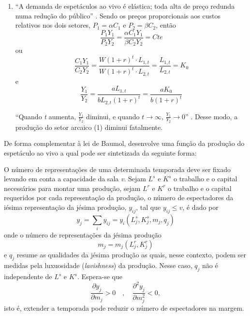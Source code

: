 \documentclass[a4paper, 12pt, openright, oneside, german, french, english, brazil]{abntex2}
\begin{document}
\begin{enumerate}
		\item ``A demanda de espetáculos ao vivo é elástica; toda alta de preço redunda numa redução do público'' \cite[p. 56]{benhamou2007economia}. Sendo os preços proporcionais aos custos relativos nos dois setores, $P_1 = \alpha C_1$ e $P_2 = \beta C_2$, então
		$$\frac{P_1Y_1}{P_2Y_2} = \frac{\alpha C_1Y_1}{\beta C_2Y_2} = Cte$$ ou
		$$\frac{C_1Y_1}{C_2Y_2} = \frac{W(1+r)^t \cdot L_{1,t}}{W(1+r)^t \cdot L_{2,t}} = \frac{L_{1,t}}{L_{2,t}} = K_0$$ e
		$$\frac{Y_1}{Y_2} = \frac{aL_{1,t}}{bL_{2,t}(1+r)^t} = \frac{aK_0}{b(1+r)^t}$$

		``Quando \textit{t} aumenta, $\frac{Y_1}{Y_2}$ diminui, e quando $t \rightarrow \infty$, $\frac{Y_1}{Y_2} \rightarrow 0$'' \cite[p. 57]{benhamou2007economia}. Desse modo, a produção do setor arcaico (1) diminui fatalmente.
	\end{enumerate}

	De forma complementar à lei de Baumol,  desenvolve uma função da produção do espetáculo ao vivo a qual pode ser sintetizada da seguinte forma:

	O número de representações de uma determinada temporada deve ser fixado levando em conta a capacidade da sala \textit{v}. Sejam $L^s$ e $K^s$ o trabalho e o capital necessários para montar uma produção, sejam $L^r$ e $K^r$ o trabalho e o capital requeridos por cada representação da produção, o número de espectadores da iésima representação da jésima produção, $y_{ij}$, tal que $y_{ij} \leq v$, é dado por
	$$y_j = \sum_iy_{ij} = y_i(L^{s}_{j}, K^{s}_{j}, m_j, q_j) $$ onde
	o número de representações da jésima produção $$m_j = m_j(L^{r}_{j}, K^{r}_{j})$$ e $q_j$ resume as qualidades da jésima produção as quais, nesse contexto, podem ser medidas pela luxuosidade (\textit{lavishness}) da produção. Nesse caso, $q_j$ não é independente de $L^s$ e $K^s$. Espera-se que $$\frac{\partial y_j}{\partial m_j} > 0 \quad, \quad \frac{\partial^2y_j}{\partial m^{2}_{j}} < 0,$$ isto é, extender a temporada pode reduzir o número de espectadores na margem.
\end{document}
